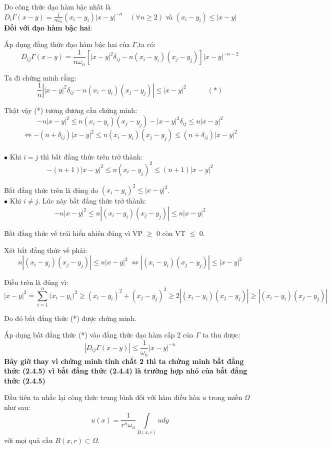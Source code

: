Do công thức đạo hàm bậc nhất là $
D_i \Gamma (x - y) = \frac{1}
{{n\omega _n }}(x_i  - y_i )|x - y|^{ - n} \quad (\forall n  \geqslant 2
)
$ và $
(x_i  - y_i ) \le |x - y|
$
\\
\textbf{Đối với đạo hàm bậc hai}:

Áp dụng đẳng thức đạo hàm bậc hai của $\Gamma$,ta có:
\[
D_{ij} \Gamma (x - y) = \frac{1}{{n\omega _n }}[|x - y|^2 \delta _{ij}  - n(x_i  - y_i )(x_j  - y_j )]|x - y|^{ - n - 2} 
\]

Ta đi chứng minh rằng:
\[
\frac{1}{n}\left| {|x - y|^2 \delta _{ij}  - n(x_i  - y_i )(x_j  - y_j )} \right| \le |x - y|^2 \quad \quad \quad (*)
\]

Thật vậy (*) tương đương cần chứng minh:
\[
 - n|x - y|^2  \le n(x_i  - y_i )(x_j  - y_j ) - |x - y|^2 \delta _{ij}  \le n|x - y|^2 
\]
\[
\Leftrightarrow
 - (n + \delta _{ij} )|x - y|^2  \le n(x_i  - y_i )(x_j  - y_j ) \le (n + \delta _{ij} )|x - y|^2 
\]
\\
$\bullet$ Khi $i=j$ thì bất đẳng thức trên trở thành:
\[
 - (n + 1)|x - y|^2  \le n(x_i  - y_j )^2  \le (n + 1)|x - y|^2 
\]

Bất đẳng thức trên là đúng do $
(x_i  - y_i )^2  \le |x - y|^2 
$.\\
$\bullet$ Khi $i \neq j$. Lúc này bất đẳng thức trở thành:
\[
 - n|x - y|^2  \le n|(x_i  - y_i )(x_j  - y_j )| \le n|x - y|^2 
\]

Bất đẳng thức vế trái hiển nhiên đúng vì VP $\geq$ 0 còn VT $\leq$ 0.

Xét bất đẳng thức vế phải:
\[
n|(x_i  - y_i )(x_j  - y_j )| \le n|x - y|^2 
\;\Leftrightarrow
|(x_i  - y_i )(x_j  - y_j )| \le |x - y|^2 
\]

Điều trên là đúng vì:
\[
|x - y|^2  = \sum\limits_{i = 1}^n {(x_i }  - y_i )^2  \ge (x_i  - y_i )^2  + (x_j  - y_j )^2  \ge 2|(x_i  - y_i )(x_j  - y_j )| \ge |(x_i  - y_i )(x_j  - y_j )|
\]

Do đó bất đẳng thức (*) được chứng minh.

Áp dụng bất đẳng thức (*) vào đẳng thức đạo hàm cấp 2 của $\Gamma$ ta thu được:
\[|D_{ij} \Gamma (x - y)| \leqslant \frac{1}
{{\omega _n }}|x - y|^{ - n}\]
\textbf{Bây giờ thay vì chứng minh tính chất 2 thì ta chứng minh bất đẳng thức (2.4.5) vì bất đẳng thức (2.4.4) là trường hợp nhỏ của bất đẳng thức (2.4.5)}

Đầu tiên ta nhắc lại công thức trung bình đối với hàm điều hòa $u$ trong miền $\Omega$ như sau:
\[
u(x) = \frac{1}{{r^n \omega _n }}\int\limits_{B(x,r)} {udy} 
\]	
với mọi quả cầu $B(x,r) \subset \Omega $.

